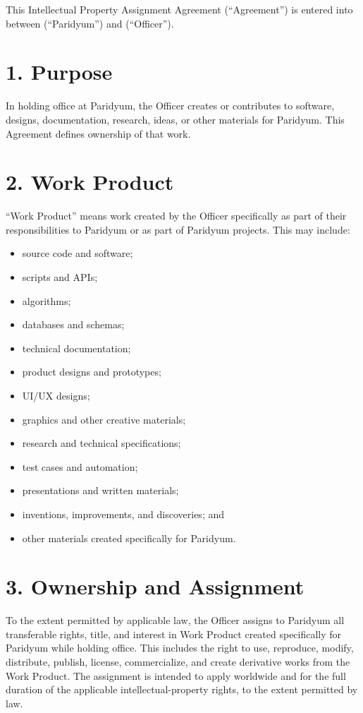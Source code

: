 \documentclass{paridyum}
\begin{document}
\paridyumletterhead
\paridyumdateref{\dkDocDate}{\dkDocRef}

This Intellectual Property Assignment Agreement (``Agreement'') is entered into
between \textbf{\dkOrgName} (``Paridyum'') and \textbf{\dkPIdentityLegalName} (``Officer'').

\section*{1. Purpose}
In holding office at Paridyum, the Officer creates or contributes to software, designs,
documentation, research, ideas, or other materials for Paridyum. This Agreement defines
ownership of that work.

\section*{2. Work Product}
``Work Product'' means work created by the Officer specifically as part of their
responsibilities to Paridyum or as part of Paridyum projects. This may include:
\begin{itemize}[leftmargin=*, noitemsep]
    \item source code and software;
    \item scripts and APIs;
    \item algorithms;
    \item databases and schemas;
    \item technical documentation;
    \item product designs and prototypes;
    \item UI/UX designs;
    \item graphics and other creative materials;
    \item research and technical specifications;
    \item test cases and automation;
    \item presentations and written materials;
    \item inventions, improvements, and discoveries; and
    \item other materials created specifically for Paridyum.
\end{itemize}

\section*{3. Ownership and Assignment}
To the extent permitted by applicable law, the Officer assigns to Paridyum all
transferable rights, title, and interest in Work Product created specifically for
Paridyum while holding office. This includes the right to use, reproduce, modify,
distribute, publish, license, commercialize, and create derivative works from the
Work Product. The assignment is intended to apply worldwide and for the full duration
of the applicable intellectual-property rights, to the extent permitted by law.
\end{document}
